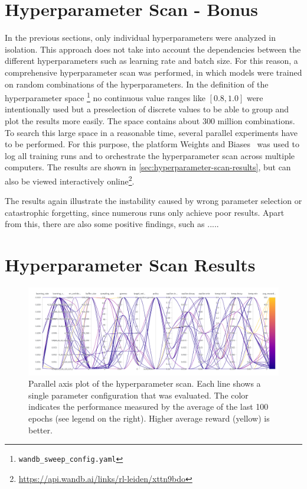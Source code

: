 \documentclass{article}
\begin{document}
\section{Hyperparameter Scan - Bonus}
\label{sec:bonus}
In the previous sections, only individual hyperparameters were analyzed in isolation.
This approach does not take into account the dependencies between the different hyperparameters 
such as learning rate and batch size\cite{DBLP:conf/iclr/SmithKYL18}.
For this reason, a comprehensive hyperparameter scan was performed, in which models were trained on random combinations of the hyperparameters. 
In the definition of the hyperparameter space \footnote{\texttt{wandb\_sweep\_config.yaml}} 
no continuous value ranges like $[0.8, 1.0]$ were intentionally used but a preselection of discrete values to be able to group and plot the results more easily.
The space contains about 300 million combinations. 
To search this large space in a reasonable time, several parallel experiments have to be performed. 
For this purpose, the platform Weights and Biases~\cite{wandb} was used to log all training runs and to orchestrate the hyperparameter scan across multiple computers.
The results are shown in \autoref{sec:hyperparameter-scan-results},
but can also be viewed interactively online\footnote{\url{https://api.wandb.ai/links/rl-leiden/xttn9bdo}}.

The results again illustrate the instability caused by wrong parameter selection or catastrophic forgetting, 
since numerous runs only achieve poor results.
Apart from this, there are also some positive findings, such as .....

\nocite{DBLP:books/sp/Plaat22}





\appendix
\section{Hyperparameter Scan Results}
\label{sec:hyperparameter-scan-results}

\begin{figure}[ht!]
   \centering
   \includegraphics[width=\textwidth]{assets/hyperparamter-scan/W&B Chart 3_30_2023, 2 24 25 PM.png}
   \caption{Parallel axis plot of the hyperparameter scan. 
      Each line shows a single parameter configuration that was evaluated. 
      The color indicates the performance measured by the average of the last 100 epochs (see legend on the right). 
      Higher average reward (yellow) is better.
   }
   \label{fig_hyperparameter_scan_parallel_axis}
\end{figure}
\end{document}
